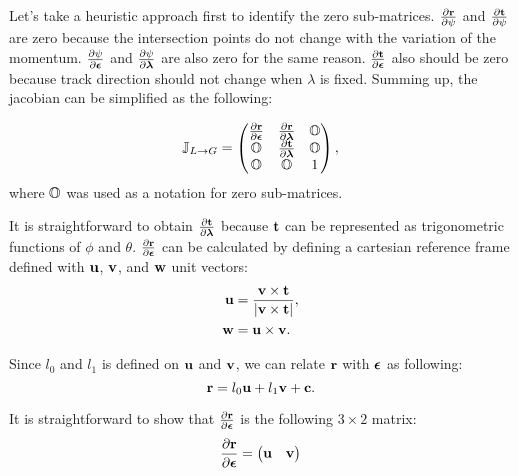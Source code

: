 \documentclass[12pt,a4paper]{scrarticle}
\begin{document}
Let's take a heuristic approach first to identify the zero sub-matrices. $\frac{\partial{\mathbf{r}}}{\partial{\psi}}$ and $\frac{\partial{\mathbf{t}}}{\partial{\psi}}$ are zero because the intersection points do not change with the variation of the momentum. $\frac{\partial{\psi}}{\partial{\boldsymbol{\epsilon}}}$ and $\frac{\partial{\psi}}{\partial{\boldsymbol{\lambda}}}$ are also zero for the same reason. $\frac{\partial{\mathbf{t}}}{\partial{\boldsymbol{\epsilon}}}$ also should be zero because track direction should not change when $\lambda$ is fixed. Summing up, the jacobian can be simplified as the following:

\begin{equation}\label{eq:jacobi2}
    \mathbb{J}_{L \rightarrow G} = 
    \begin{pmatrix}
     \frac{\partial{\mathbf{r}}}{\partial{\boldsymbol{\epsilon}}} & \frac{\partial{\mathbf{r}}}{\partial{\boldsymbol{\lambda}}} &  \mathbb{O} \\
     \mathbb{O} & \frac{\partial{\mathbf{t}}}{\partial{\boldsymbol{\lambda}}} &  \mathbb{O} \\
     \mathbb{O} & \mathbb{O} & 1
    \end{pmatrix},
\end{equation}
where $\mathbb{O}$ was used as a notation for zero sub-matrices.

It is straightforward to obtain $\frac{\partial{\mathbf{t}}}{\partial{\boldsymbol{\lambda}}}$ because $\mathbf{t}$ can be represented as trigonometric functions of $\phi$ and $\theta$. $\frac{\partial{\mathbf{r}}}{\partial{\boldsymbol{\epsilon}}}$ can be calculated by defining a cartesian reference frame defined with $\mathbf{u}$, $\mathbf{v}$, and $\mathbf{w}$ unit vectors:
\begin{align}\label{eq:new_coord}
    \mathbf{u} & = \frac{\mathbf{v} \times \mathbf{t}}{|\mathbf{v} \times \mathbf{t}|}, \nonumber \\
    \mathbf{w} & =  \mathbf{u} \times \mathbf{v}.
\end{align}

Since $l_0$ and $l_1$ is defined on $\mathbf{u}$ and $\mathbf{v}$, 
we can relate $\mathbf{r}$ with $\boldsymbol{\epsilon}$ as following: 
\begin{equation}\label{eq:r_in_uv}
    \mathbf{r} = l_0 \mathbf{u} + l_1 \mathbf{v} +  \mathbf{c}.
\end{equation}

It is straightforward to show that
$\frac{\partial{\mathbf{r}}}{\partial{\boldsymbol{\epsilon}}}$ is the following $3 \times 2$ matrix: 
\begin{equation}
\frac{\partial{\mathbf{r}}}{\partial{\boldsymbol{\epsilon}}}=
    \begin{pmatrix}
     \mathbf{u} & \mathbf{v} 
    \end{pmatrix}    
\end{equation}
\end{document}
